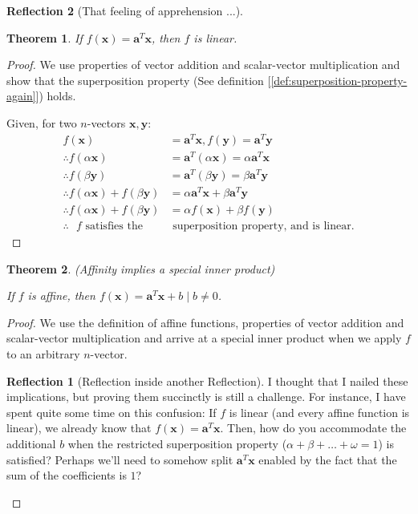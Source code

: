 \documentclass[11pt]{book}
\theoremstyle{definition}
\theoremstyle{plain}
\newtheorem{theorem}{Theorem}
\theoremstyle{problemstyle}
\theoremstyle{remark}
\theoremstyle{definition}
\newtheorem{reflection}{Reflection}
\begin{document}
\begin{reflection}[That feeling of apprehension ...]
\begin{theorem}
        If $f(\boldsymbol{x})=\boldsymbol{a}^T\boldsymbol{x}$, then $f$ is linear.
    \end{theorem}
    \begin{proof}
        We use properties of vector addition and scalar-vector multiplication and show that the superposition property (See definition [\ref{def:superposition-property-again}]) holds.

        Given, for two $n$-vectors $\boldsymbol{x,y}$: 
        \begin{equation}
            \begin{aligned}
                f(\boldsymbol{x})&=\boldsymbol{a}^T\boldsymbol{x}, f(\boldsymbol{y})=\boldsymbol{a}^T\boldsymbol{y}\\
                \therefore f(\alpha\boldsymbol{x})&=\boldsymbol{a}^T(\alpha\boldsymbol{x})=\alpha\boldsymbol{a}^T\boldsymbol{x}\\
                \therefore f(\beta\boldsymbol{y})&=\boldsymbol{a}^T(\beta\boldsymbol{y})=\beta\boldsymbol{a}^T\boldsymbol{y}\\
                \therefore f(\alpha\boldsymbol{x})+f(\beta\boldsymbol{y})&=\alpha\boldsymbol{a}^T\boldsymbol{x}+\beta\boldsymbol{a}^T\boldsymbol{y}\\
                \therefore f(\alpha\boldsymbol{x})+f(\beta\boldsymbol{y})&=\alpha f(\boldsymbol{x})+\beta f(\boldsymbol{y})\\
                \therefore\text{ $f$ satisfies the}&\text{ superposition property, and is linear.}
            \end{aligned}
        \end{equation}
    \end{proof}
    \begin{theorem}(Affinity implies a special inner product)
        \label{th:affinity->special-inner-product}

        If $f$ is affine, then $f(\boldsymbol{x})=\boldsymbol{a}^T\boldsymbol{x}+b\mid b\ne 0$.

    \end{theorem}
    \begin{proof}
        We use the definition of affine functions, properties of vector addition and scalar-vector multiplication and arrive at a special inner product when we apply $f$ to an arbitrary $n$-vector.
        \begin{reflection}[Reflection inside another Reflection]
            I thought that I nailed these implications, but proving them succinctly is still a challenge. For instance, I have spent quite some time on this confusion: If $f$ is linear (and every affine function is linear), we already know that $f(\boldsymbol{x})=\boldsymbol{a}^T\boldsymbol{x}$. Then, how do you accommodate the additional $b$ when the restricted superposition property ($\alpha+\beta+\dots+\omega=1$) is satisfied? Perhaps we'll need to somehow split $\boldsymbol{a}^T\boldsymbol{x}$ enabled by the fact that the sum of the coefficients is $1$?


\end{reflection}
\end{proof}
\end{reflection}
\end{document}
